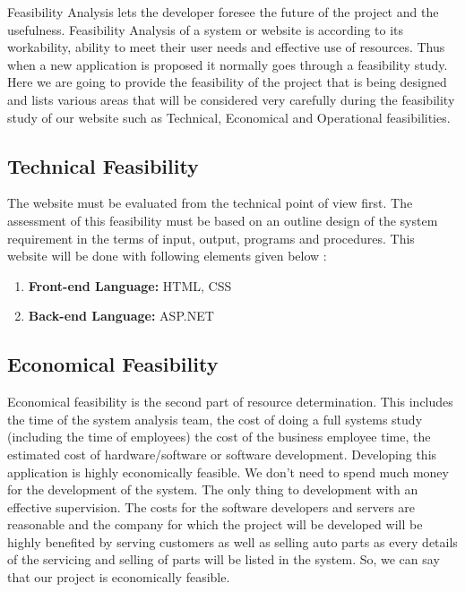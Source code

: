 \documentclass[10pt,twosides]{report}
\begin{document}
\noindent Feasibility Analysis lets the developer foresee the future of the project and the usefulness. Feasibility Analysis of a system or website is according to its workability, ability to meet their user needs and effective use of resources. Thus when a new application is proposed it normally goes through a feasibility study. Here we are going to provide the feasibility of the project that is being designed and lists various areas that will be considered very carefully during the feasibility study of our website such as Technical, Economical and Operational feasibilities.
\noindent 

\newpage
\subsection{    Technical Feasibility }
The website must be evaluated from the technical point of view first. The assessment of this feasibility must be based on an outline design of the system requirement in the terms of input, output, programs and procedures. This website will be done with following elements given below :
\noindent 

\begin{enumerate}
\item  \textbf{Front-end Language:} HTML, CSS

\item  \textbf{Back-end Language:} ASP.NET
\\
\end{enumerate}



\subsection{    Economical Feasibility } 

Economical feasibility is the second part of resource determination. This includes the time of the system analysis team, the cost of doing a full systems study (including the time of employees) the cost of the business employee time, the estimated cost of hardware/software or software development. Developing this application is highly economically feasible. We don’t need to spend much money for the development of the system. The only thing to development with an effective supervision. The costs for the software developers and servers are reasonable and the company for which the project will be developed will be highly benefited by serving customers as well as selling auto parts as every details of the servicing and selling of parts will be listed in the system. So, we can say that our project is economically feasible.
\end{document}
